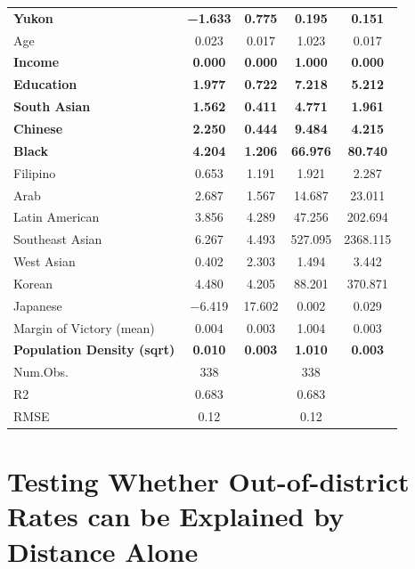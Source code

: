 \documentclass[
  letterpaper,
  DIV=11,
  numbers=noendperiod]{scrartcl}
\begin{document}
\begin{table}
{\begin{tabular}[t]{lcccc}
\textbf{Yukon} & \textbf{\num{-1.633}} & \textbf{\num{0.775}} & \textbf{\num{0.195}} & \textbf{\num{0.151}}\\
Age & \num{0.023} & \num{0.017} & \num{1.023} & \num{0.017}\\
\textbf{Income} & \textbf{\num{0.000}} & \textbf{\num{0.000}} & \textbf{\num{1.000}} & \textbf{\num{0.000}}\\
\textbf{Education} & \textbf{\num{1.977}} & \textbf{\num{0.722}} & \textbf{\num{7.218}} & \textbf{\num{5.212}}\\
\textbf{South Asian} & \textbf{\num{1.562}} & \textbf{\num{0.411}} & \textbf{\num{4.771}} & \textbf{\num{1.961}}\\
\textbf{Chinese} & \textbf{\num{2.250}} & \textbf{\num{0.444}} & \textbf{\num{9.484}} & \textbf{\num{4.215}}\\
\textbf{Black} & \textbf{\num{4.204}} & \textbf{\num{1.206}} & \textbf{\num{66.976}} & \textbf{\num{80.740}}\\
Filipino & \num{0.653} & \num{1.191} & \num{1.921} & \num{2.287}\\
Arab & \num{2.687} & \num{1.567} & \num{14.687} & \num{23.011}\\
Latin American & \num{3.856} & \num{4.289} & \num{47.256} & \num{202.694}\\
Southeast Asian & \num{6.267} & \num{4.493} & \num{527.095} & \num{2368.115}\\
West Asian & \num{0.402} & \num{2.303} & \num{1.494} & \num{3.442}\\
Korean & \num{4.480} & \num{4.205} & \num{88.201} & \num{370.871}\\
Japanese & \num{-6.419} & \num{17.602} & \num{0.002} & \num{0.029}\\
Margin of Victory (mean) & \num{0.004} & \num{0.003} & \num{1.004} & \num{0.003}\\
\textbf{Population Density (sqrt)} & \textbf{\num{0.010}} & \textbf{\num{0.003}} & \textbf{\num{1.010}} & \textbf{\num{0.003}}\\
\midrule
Num.Obs. & \num{338} &  & \num{338} & \\
R2 & \num{0.683} &  & \num{0.683} & \\
RMSE & \num{0.12} &  & \num{0.12} & \\
\bottomrule
\end{tabular}

}

\end{table}%

\section{Testing Whether Out-of-district Rates can be Explained by
Distance Alone}\label{sec-district-propensity-simulation}
\end{document}
